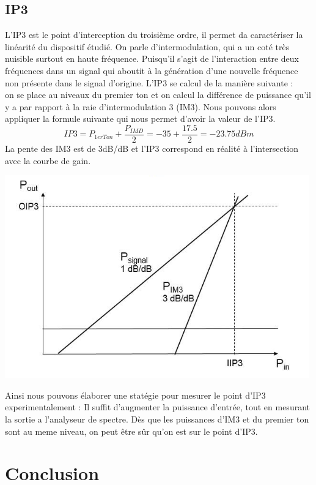\documentclass[a4paper,12pt]{report}            %
\begin{document}
\section{IP3}
L'IP3 est le point d'interception du troisième ordre, il permet da caractériser la linéarité du dispositif étudié.
On parle d'intermodulation, qui a un coté très nuisible surtout en haute fréquence. Puisqu'il s’agit de l’interaction entre 
deux fréquences dans un signal qui aboutit à la génération d’une nouvelle fréquence non 
présente dans le signal d’origine.
L'IP3 se calcul de la manière suivante : \\
on se place au niveaux du premier ton et on calcul la différence de puissance qu'il y a par rapport à la raie d'intermodulation 3 (IM3).
Nous pouvons alors appliquer la formule suivante qui nous permet d'avoir la valeur de l'IP3.
$$ IP3 = P_{1erTon} + \frac{P_{IMD}}{2} = -35 + \frac{17.5}{2} = -23.75 dBm $$
La pente des IM3 est de 3dB/dB et l'IP3 correspond en réalité à l'intersection avec la courbe de gain.
\begin{center}\includegraphics[scale = 0.7]{pic/IP3.png}\\ \end{center}
    Ainsi nous pouvons élaborer une statégie pour mesurer le point d'IP3 experimentalement :
Il suffit d'augmenter la puissance d'entrée, tout en mesurant la sortie a l'analyseur de spectre.
Dès que les puissances d'IM3 et du premier ton sont au meme niveau, on peut être sûr qu'on est sur le point d'IP3.
\chapter{Conclusion}
\end{document}
